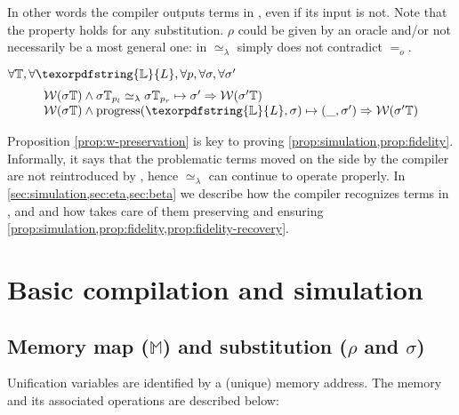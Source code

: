 \documentclass[sigconf,natbib=false,review]{acmart}
\newcommand{\EqualRel}{\ensuremath{=}}
\newcommand{\UnifRel}{\ensuremath{\simeq}}
\newcommand{\Eo}{\ensuremath{\EqualRel_o}\xspace}
\newcommand{\Ue}{\ensuremath{\UnifRel_\lambda}\xspace}
\newcommand{\linkStore}{\texorpdfstring{\ensuremath{\mathbb{L}}\xspace}{L}}
\newcommand{\mapStore}{\texorpdfstring{\ensuremath{\mathbb{M}}\xspace}{M}}
\newcommand{\hoUnifPb}{\ensuremath{\mathbb{T}}\xspace}
\begin{document}
\noindent
In other words the compiler outputs terms in \wellb, even if its
input is not.
Note that the property holds for any substitution. $\rho$ could be given by an
oracle and/or not necessarily be a most general one: in \wellb \Ue{} simply
does not contradict \Eo.

\begin{proposition}\label{prop:w-preservation}
$\forall \hoUnifPb, \forall \linkStore, \forall p, \forall \sigma, \forall \sigma'$
$$
\begin{array}{l}
\wellb(\sigma\hoUnifPb) \land
  \sigma\hoUnifPb_{p_l} \Ue \sigma\hoUnifPb_{p_r} \mapsto {\sigma'}
  \Rightarrow \wellb(\sigma' \hoUnifPb)\\
\wellb(\sigma\hoUnifPb) \land
  \progress(\linkStore,\sigma) \mapsto (\_,\sigma')
  \Rightarrow \wellb(\sigma' \hoUnifPb)
\end{array}
$$
\end{proposition}

\noindent
Proposition \ref{prop:w-preservation} is key to proving \cref{prop:simulation,prop:fidelity}.
Informally, it says that the problematic terms moved on the side by the compiler
are not reintroduced by \hstep, hence \Ue{} can continue to operate properly.
In \cref{sec:simulation,sec:eta,sec:beta}
we describe how the compiler recognizes terms in \maybebeta, \maybeeta and
\notllambda and how \progress takes care of them preserving \wellb
and ensuring \cref{prop:simulation,prop:fidelity,prop:fidelity-recovery}.


\section{Basic compilation and simulation}
\label{sec:simulation}


\subsection{Memory map (\mapStore) and substitution (\texorpdfstring{$\rho$ and $\sigma$}{rho and sigma})}
\label{sec:grounwork}


% 

Unification variables are identified by a (unique) memory address.
The memory and its associated operations are described below:
\end{document}
